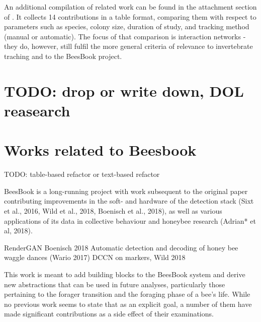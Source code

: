 An additional compilation of related work can be found in the attachment section
of \citep{schlegel_temporal_2017}. It collects 14 contributions in a table
format, comparing them with respect to parameters such as species, colony size,
duration of study, and tracking method (manual or automatic). The focus of that
comparison is interaction networks - they do, however, still fulfil the more
general criteria of relevance to invertebrate traching and to the BeesBook project.

\section{TODO: drop or write down, DOL reasearch} 


\section{Works related to Beesbook} 

TODO: table-based refactor or text-based refactor

BeesBook is a long-running project with work subsequent to the original paper
contributing improvements in the soft- and hardware of the detection stack (Sixt
et al., 2016, Wild et al., 2018, Boenisch et al., 2018), as well as various
applications of its data in collective behaviour and honeybee research (Adrian*
et al, 2018).

RenderGAN Boenisch 2018 Automatic detection and decoding of honey bee waggle
dances (Wario 2017) DCCN on markers, Wild 2018

This work is meant to add building blocks to the BeesBook system and derive new
abstractions that can be used in future analyses, particularly those pertaining
to the forager transition and the foraging phase of a bee’s life. While no
previous work seems to state that as an explicit goal, a number of them have
made significant contributions as a side effect of their examinations.
